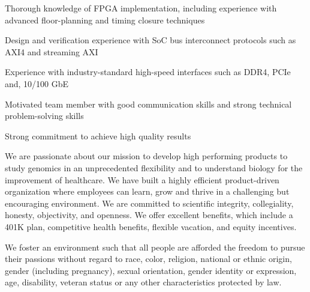 \par Thorough knowledge of FPGA implementation, including experience with advanced floor-planning and timing closure techniques
\par Design and verification experience with SoC bus interconnect protocols such as AXI4 and streaming AXI
\par Experience with industry-standard high-speed interfaces such as DDR4, PCIe and, 10/100 GbE
\par Motivated team member with good communication skills and strong technical problem-solving skills
\par Strong commitment to achieve high quality results
\par We are passionate about our mission to develop high performing products to study genomics in an unprecedented flexibility and to understand biology for the improvement of healthcare. We have built a highly efficient product-driven organization where employees can learn, grow and thrive in a challenging but encouraging environment. We are committed to scientific integrity, collegiality, honesty, objectivity, and openness.  We offer excellent benefits, which include a 401K plan, competitive health benefits, flexible vacation, and equity incentives. 
\par We foster an environment such that all people are afforded the freedom to pursue their passions without regard to race, color, religion, national or ethnic origin, gender (including pregnancy), sexual orientation, gender identity or expression, age, disability, veteran status or any other characteristics protected by law.

\bye
